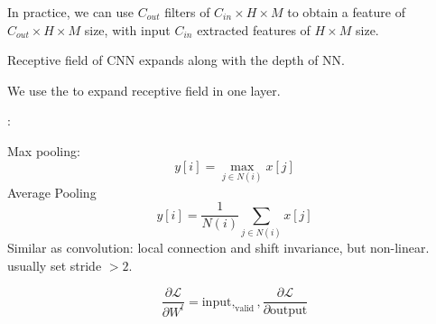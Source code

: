 In practice, we can use  $ C_{out} $ filters of  $ C_{in}\times H\times M $  to obtain a feature of  $ C_{out}\times H\times M $ size, with input  $ C_{in} $ extracted features of  $ H\times M $  size. 

Receptive field of CNN expands along with the depth of NN.

We use the  to expand receptive field in one layer.

: 

Max pooling:
\[y[i]=\max_{j\in N(i)}x[j]\]
Average Pooling 
\[y[i]=\frac{1}{N(i)}\sum_{j\in N(i)}x[j]\]
Similar as convolution: local connection and shift invariance, but non-linear. usually set stride  $ >2 $.

\[
\frac{\partial \mathcal{L}}{\partial W^l} = \text{input} , _{\text{valid}} , \frac{\partial \mathcal{L}}{\partial \text{output}}
\]


